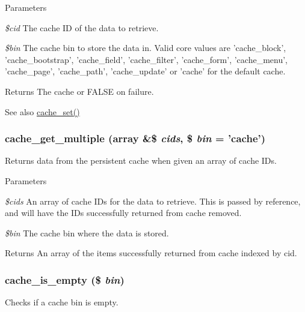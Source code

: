 \begin{DoxyParams}{Parameters}
\item[{\em \$cid}]The cache ID of the data to retrieve. \item[{\em \$bin}]The cache bin to store the data in. Valid core values are 'cache\_\-block', 'cache\_\-bootstrap', 'cache\_\-field', 'cache\_\-filter', 'cache\_\-form', 'cache\_\-menu', 'cache\_\-page', 'cache\_\-path', 'cache\_\-update' or 'cache' for the default cache.\end{DoxyParams}
\begin{DoxyReturn}{Returns}
The cache or FALSE on failure.
\end{DoxyReturn}
\begin{DoxySeeAlso}{See also}
\hyperlink{includes_2cache_8inc_a48081f36334909f561ef4f538fa640d2}{cache\_\-set()} 
\end{DoxySeeAlso}
\hypertarget{includes_2cache_8inc_a2c67628faec5b49aa0fdc987422540d4}{
\subsubsection[{cache\_\-get\_\-multiple}]{\setlength{\rightskip}{0pt plus 5cm}cache\_\-get\_\-multiple (array \&\$ {\em cids}, \/  \$ {\em bin} = {\ttfamily 'cache'})}}
\label{includes_2cache_8inc_a2c67628faec5b49aa0fdc987422540d4}
Returns data from the persistent cache when given an array of cache IDs.


\begin{DoxyParams}{Parameters}
\item[{\em \$cids}]An array of cache IDs for the data to retrieve. This is passed by reference, and will have the IDs successfully returned from cache removed. \item[{\em \$bin}]The cache bin where the data is stored.\end{DoxyParams}
\begin{DoxyReturn}{Returns}
An array of the items successfully returned from cache indexed by cid. 
\end{DoxyReturn}
\hypertarget{includes_2cache_8inc_a859ec549c0cf60273cb094fa42a14604}{
\subsubsection[{cache\_\-is\_\-empty}]{\setlength{\rightskip}{0pt plus 5cm}cache\_\-is\_\-empty (\$ {\em bin})}}
\label{includes_2cache_8inc_a859ec549c0cf60273cb094fa42a14604}
Checks if a cache bin is empty.

